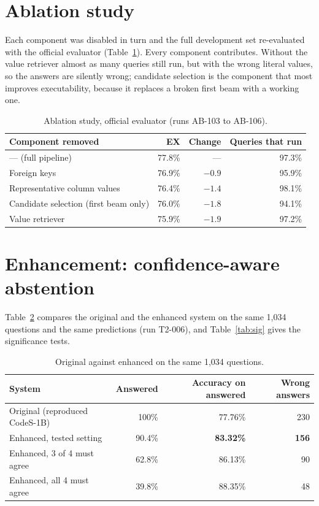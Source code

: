 \section{Ablation study}

Each component was disabled in turn and the full development set re-evaluated with the official evaluator (Table~\ref{tab:ablation}). Every component contributes. Without the value retriever almost as many queries still run, but with the wrong literal values, so the answers are silently wrong; candidate selection is the component that most improves executability, because it replaces a broken first beam with a working one.

\begin{table}[!t]
	\centering
	\caption{Ablation study, official evaluator (runs AB-103 to AB-106).}
	\label{tab:ablation}
	\singlespacing
	\begin{tabular}{|l|r|r|r|}
		\hline
		\textbf{Component removed} & \textbf{EX} & \textbf{Change} & \textbf{Queries that run} \\ \hline
		--- (full pipeline) & 77.8\% & --- & 97.3\% \\ \hline
		Foreign keys & 76.9\% & $-0.9$ & 95.9\% \\ \hline
		Representative column values & 76.4\% & $-1.4$ & 98.1\% \\ \hline
		Candidate selection (first beam only) & 76.0\% & $-1.8$ & 94.1\% \\ \hline
		Value retriever & 75.9\% & $-1.9$ & 97.2\% \\ \hline
	\end{tabular}
\end{table}

\section{Enhancement: confidence-aware abstention}

Table~\ref{tab:enh} compares the original and the enhanced system on the same 1,034 questions and the same predictions (run T2-006), and Table~\ref{tab:sig} gives the significance tests.

\begin{table}[!t]
	\centering
	\caption{Original against enhanced on the same 1,034 questions.}
	\label{tab:enh}
	\singlespacing
	\begin{tabular}{|l|r|r|r|}
		\hline
		\textbf{System} & \textbf{Answered} & \textbf{Accuracy on answered} & \textbf{Wrong answers} \\ \hline
		Original (reproduced CodeS-1B) & 100\% & 77.76\% & 230 \\ \hline
		Enhanced, tested setting & 90.4\% & \textbf{83.32\%} & \textbf{156} \\ \hline
		Enhanced, 3 of 4 must agree & 62.8\% & 86.13\% & 90 \\ \hline
		Enhanced, all 4 must agree & 39.8\% & 88.35\% & 48 \\ \hline
	\end{tabular}
\end{table}


